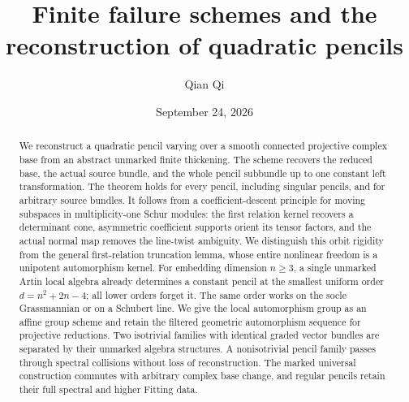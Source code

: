 \title[Finite failure schemes and quadratic pencils]{Finite failure schemes and the reconstruction of quadratic pencils}
\author{Qian Qi}
\date{September 24, 2026}
\begin{abstract}
We reconstruct a quadratic pencil varying over a smooth connected
projective complex base from an abstract unmarked finite thickening.
The scheme recovers the reduced base, the actual source bundle, and
the whole pencil subbundle up to one constant left transformation.
The theorem holds for every pencil, including singular pencils, and
for arbitrary source bundles.  It follows from a coefficient-descent
principle for moving subspaces in multiplicity-one Schur modules:
the first relation kernel recovers a determinant cone, asymmetric
coefficient supports orient its tensor factors, and the actual
normal map removes the line-twist ambiguity.  We distinguish this
orbit rigidity from the general first-relation truncation lemma,
whose entire nonlinear freedom is a unipotent automorphism kernel.
For embedding dimension \(n\ge3\), a single unmarked Artin local
algebra already determines a constant pencil at the smallest uniform
order \(d=n^2+2n-4\); all lower orders forget it.  The same order
works on the socle Grassmannian or on a Schubert line.  We give the
local automorphism group as an affine group scheme and retain the
filtered geometric automorphism sequence for projective reductions.
Two isotrivial families with identical graded vector bundles are
separated by their unmarked algebra structures.  A nonisotrivial
pencil family passes through spectral collisions without loss of reconstruction.  The marked universal construction commutes
with arbitrary complex base change, and regular pencils retain their
full spectral and higher Fitting data.
\end{abstract}
\maketitle
